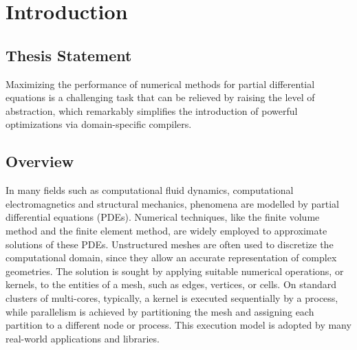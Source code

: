 \chapter{Introduction}

\section{Thesis Statement}




Maximizing the performance of numerical methods for partial differential equations is a challenging task that can be relieved by raising the level of abstraction, which remarkably simplifies the introduction of powerful optimizations via domain-specific compilers. 

\section{Overview}
In many fields such as computational fluid dynamics, computational electromagnetics and structural mechanics, phenomena are modelled by partial differential equations (PDEs). Numerical techniques, like the finite volume method and the finite element method, are widely employed to approximate solutions of these PDEs. Unstructured meshes are often used to discretize the computational domain, since they allow an accurate representation of complex geometries. The solution is sought by applying suitable numerical operations, or
kernels, to the entities of a mesh, such as edges, vertices, or cells. On standard clusters of multi-cores, typically, a kernel is executed sequentially by a process, while parallelism is achieved by partitioning the mesh and assigning each partition to a different node or process. This execution model is adopted by many real-world applications and libraries.

